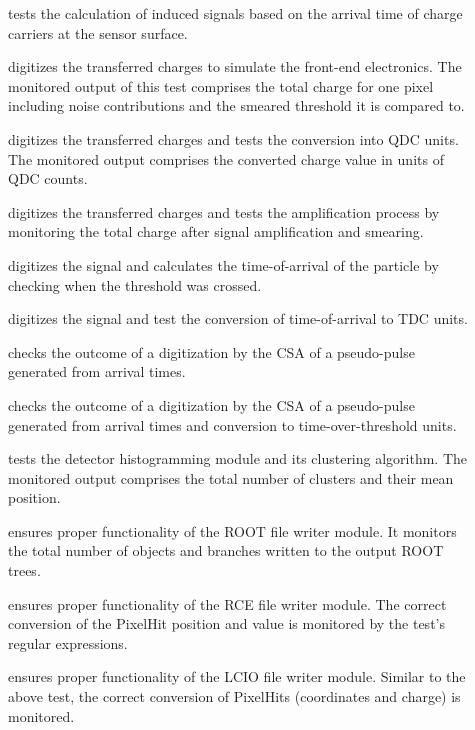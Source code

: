 \begin{description}
    \item[] tests the calculation of induced signals based on the arrival time of charge carriers at the sensor surface.
    \item[] digitizes the transferred charges to simulate the front-end electronics. The monitored output of this test comprises the total charge for one pixel including noise contributions and the smeared threshold it is compared to.
    \item[] digitizes the transferred charges and tests the conversion into QDC units. The monitored output comprises the converted charge value in units of QDC counts.
    \item[] digitizes the transferred charges and tests the amplification process by monitoring the total charge after signal amplification and smearing.
    \item[] digitizes the signal and calculates the time-of-arrival of the particle by checking when the threshold was crossed.
    \item[] digitizes the signal and test the conversion of time-of-arrival to TDC units.
    \item[] checks the outcome of a digitization by the CSA of a pseudo-pulse generated from arrival times.
    \item[] checks the outcome of a digitization by the CSA of a pseudo-pulse generated from arrival times and conversion to time-over-threshold units.
    \item[] tests the detector histogramming module and its clustering algorithm. The monitored output comprises the total number of clusters and their mean position.
    \item[] ensures proper functionality of the ROOT file writer module. It monitors the total number of objects and branches written to the output ROOT trees.
    \item[] ensures proper functionality of the RCE file writer module. The correct conversion of the PixelHit position and value is monitored by the test's regular expressions.
    \item[] ensures proper functionality of the LCIO file writer module. Similar to the above test, the correct conversion of PixelHits (coordinates and charge) is monitored.

\end{description}
